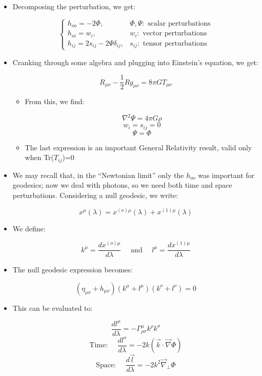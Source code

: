 \begin{itemize}
\begin{itemize}
      \item Decomposing the perturbation, we get:

        $$\left\{\begin{array}{ll} h_{oo}=-2\Phi, & \Phi,\Psi:\text{ scalar perturbations}\\h_{oi}=w_i, & w_i:\text{ vector perturbations}\\h_{ij}=2s_{ij}-2\Psi\delta_{ij}, & s_{ij}:\text{ tensor perturbations}\end{array}$$

        \item Cranking through some algebra and plugging into Einstein's equation, we get:

          $$R_{\mu\nu}-\frac{1}{2}Rg_{\mu\nu}=8\pi GT_{\mu\nu}$$

          \begin{itemize}

            \item From this, we find:

              $$\nabla^2\Psi=4\pi G\rho$$
              $$w_i=s_{ij}=0$$
              $$\Psi=\Phi$$

            \item The last expression is an important General Relativity result, valid only when Tr($T_{ij}$)=0

          \end{itemize}

        \item We may recall that, in the ``Newtonian limit'' only the $h_{oo}$ was important for geodesics; now we deal with photons, so we need both time and space perturbations. Considering a null geodesic, we write:

          $$x^{\mu}(\lambda)=x^{(o)\mu}(\lambda)+x^{(1)\mu}(\lambda)$$

        \item We define:

          $$k^{\mu}=\frac{dx^{(o)\mu}}{d\lambda}\quad\text{ and }\quad l^{\mu}=\frac{dx^{(1)\mu}}{d\lambda}$$

        \item The null geodesic expression becomes:

          $$(\eta_{\mu\nu}+h_{\mu\nu})(k^{\mu}+l^{\mu})(k^{\nu}+l^{\nu})=0$$

        \item This can be evaluated to:

          $$\frac{dl^{\mu}}{d\lambda}=-\Gamma^{\mu}_{\rho\sigma}k^{\rho}k^{\sigma}$$
          $$\text{Time: }\quad\frac{dl^{o}}{d\lambda}=-2k(\vec{k}\cdot\vec{\nabla}\Phi)$$
          $$\text{Space: }\quad\frac{d\vec{l}}{d\lambda}=-2k^2\vec{\nabla}_{\perp}\Phi$$


\end{itemize}
\end{itemize}
